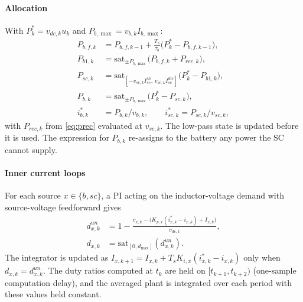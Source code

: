 \paragraph{Allocation} With $P^*_k=v_{dc,k}u_k$ and $P_{b,\max}=v_{b,k}I_{b,\max}$:
\begin{align}
P_{b,f,k}&=P_{b,f,k-1}+\tfrac{T_s}{\tau_b}\big(P^*_k-P_{b,f,k-1}\big),\label{eq:alloc1}\\
P_{b1,k}&=\mathrm{sat}_{\pm P_{b,\max}}\big(P_{b,f,k}+P_{rec,k}\big),\nonumber\\
P_{sc,k}&=\mathrm{sat}_{[-v_{sc,k}I^{ch}_{sc},\,v_{sc,k}I^{dis}_{sc}]}\big(P^*_k-P_{b1,k}\big),\label{eq:alloc2}\\
P_{b,k}&=\mathrm{sat}_{\pm P_{b,\max}}\big(P^*_k-P_{sc,k}\big),\nonumber\\
i^*_{b,k}&=P_{b,k}/v_{b,k},\qquad i^*_{sc,k}=P_{sc,k}/v_{sc,k},\label{eq:alloc3}
\end{align}
with $P_{rec,k}$ from \eqref{eq:prec} evaluated at $v_{sc,k}$. The low-pass state is updated before it is used. The expression for $P_{b,k}$ re-assigns to the battery any power the SC cannot supply.

\paragraph{Inner current loops} For each source $x\in\{b,sc\}$, a PI acting on the inductor-voltage demand with source-voltage feedforward gives
\begin{align}
d^{un}_{x,k}&=1-\frac{v_{x,k}-\big(K_{p,x}(i^*_{x,k}-i_{x,k})+I_{x,k}\big)}{v_{dc,k}},\nonumber\\
d_{x,k}&=\mathrm{sat}_{[0,d_{\max}]}(d^{un}_{x,k}).\label{eq:duty}
\end{align}
The integrator is updated as $I_{x,k+1}=I_{x,k}+T_sK_{i,x}(i^*_{x,k}-i_{x,k})$ only when $d_{x,k}=d^{un}_{x,k}$. The duty ratios computed at $t_k$ are held on $[t_{k+1},t_{k+2})$ (one-sample computation delay), and the averaged plant is integrated over each period with these values held constant.



